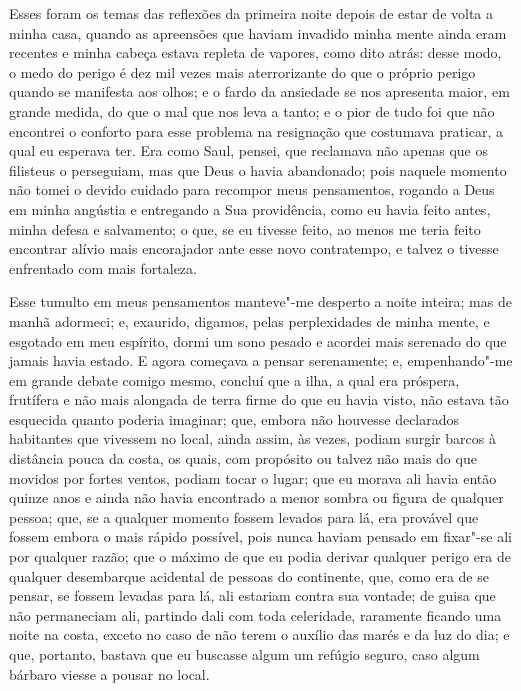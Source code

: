 Esses foram os temas das reflexões da primeira noite depois de estar de
volta a minha casa, quando as apreensões que haviam invadido minha mente
ainda eram recentes e minha cabeça estava repleta de vapores, como dito
atrás: desse modo, o medo do perigo é dez mil vezes mais aterrorizante
do que o próprio perigo quando se manifesta aos olhos; e o fardo da
ansiedade se nos apresenta maior, em grande medida, do que o mal que nos
leva a tanto; e o pior de tudo foi que não encontrei o conforto para
esse problema na resignação que costumava praticar, a qual eu esperava
ter. Era como Saul, pensei, que reclamava não apenas que os filisteus o
perseguiam, mas que Deus o havia abandonado; pois naquele momento não
tomei o devido cuidado para recompor meus pensamentos, rogando a Deus em
minha angústia e entregando a Sua providência, como eu havia feito
antes, minha defesa e salvamento; o que, se eu tivesse feito, ao menos
me teria feito encontrar alívio mais encorajador ante esse novo
contratempo, e talvez o tivesse enfrentado com mais fortaleza.

Esse tumulto em meus pensamentos manteve"-me desperto a noite inteira;
mas de manhã adormeci; e, exaurido, digamos, pelas perplexidades de
minha mente, e esgotado em meu espírito, dormi um sono pesado e acordei
mais serenado do que jamais havia estado. E agora começava a pensar
serenamente; e, empenhando"-me em grande debate comigo mesmo, concluí que
a ilha, a qual era próspera, frutífera e não mais alongada de terra
firme do que eu havia visto, não estava tão esquecida quanto poderia
imaginar; que, embora não houvesse declarados habitantes que vivessem no
local, ainda assim, às vezes, podiam surgir barcos à distância pouca da
costa, os quais, com propósito ou talvez não mais do que movidos por
fortes ventos, podiam tocar o lugar; que eu morava ali havia então
quinze anos e ainda não havia encontrado a menor sombra ou figura de
qualquer pessoa; que, se a qualquer momento fossem levados para lá, era
provável que fossem embora o mais rápido possível, pois nunca haviam
pensado em fixar"-se ali por qualquer razão; que o máximo de que eu podia
derivar qualquer perigo era de qualquer desembarque acidental de pessoas
do continente, que, como era de se pensar, se fossem levadas para lá,
ali estariam contra sua vontade; de guisa que não permaneciam ali,
partindo dali com toda celeridade, raramente ficando uma noite na costa,
exceto no caso de não terem o auxílio das marés e da luz do dia; e que,
portanto, bastava que eu buscasse algum um refúgio seguro, caso algum
bárbaro viesse a pousar no local.

